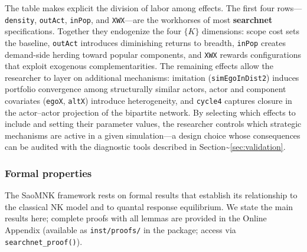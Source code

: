 \documentclass[
]{article}
\begin{document}
The table makes explicit the division of labor among effects. The first
four rows---\texttt{density}, \texttt{outAct}, \texttt{inPop}, and
\texttt{XWX}---are the workhorses of most \textbf{searchnet}
specifications. Together they endogenize the four \(\{K\}\) dimensions:
scope cost sets the baseline, \texttt{outAct} introduces diminishing
returns to breadth, \texttt{inPop} creates demand-side herding toward
popular components, and \texttt{XWX} rewards configurations that exploit
exogenous complementarities. The remaining effects allow the researcher
to layer on additional mechanisms: imitation (\texttt{simEgoInDist2})
induces portfolio convergence among structurally similar actors, actor
and component covariates (\texttt{egoX}, \texttt{altX}) introduce
heterogeneity, and \texttt{cycle4} captures closure in the actor--actor
projection of the bipartite network. By selecting which effects to
include and setting their parameter values, the researcher controls
which strategic mechanisms are active in a given simulation---a design
choice whose consequences can be audited with the diagnostic tools
described in Section\textasciitilde{}\ref{sec:validation}.

\subsubsection{Formal properties}\label{sec:formal-properties}

The SaoMNK framework rests on formal results that establish its
relationship to the classical NK model and to quantal response
equilibrium. We state the main results here; complete proofs with all
lemmas are provided in the Online Appendix
\citep[see also][]{downing2026architecture} (available as
\texttt{inst/proofs/} in the package; access via
\texttt{searchnet\_proof()}).
\end{document}
